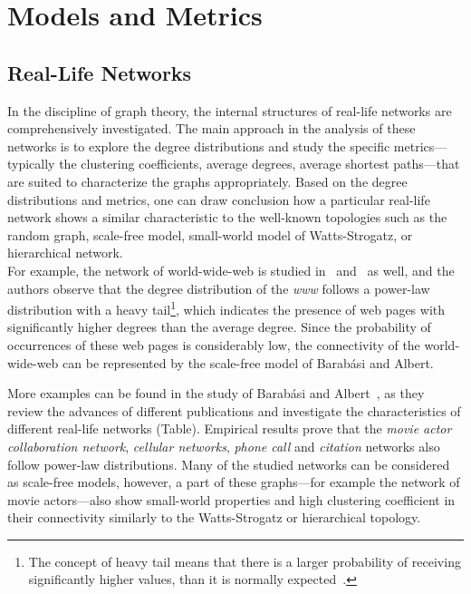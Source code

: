 \section{Models and Metrics}
\subsection{Real-Life Networks}

In the discipline of graph theory, the internal structures of real-life networks are comprehensively investigated. The main approach in the analysis of these networks is to explore the degree distributions and study the specific metrics---typically the clustering coefficients, average degrees, average shortest paths---that are suited to characterize the graphs appropriately. Based on the degree distributions and metrics, one can draw conclusion how a particular real-life network shows a similar characteristic to the well-known topologies such as the random graph, scale-free model, small-world model of Watts-Strogatz, or hierarchical network.\\
For example, the network of world-wide-web is studied in~\cite{www1} and~\cite{www2} as well, and the authors observe that the degree distribution of the \textit{www} follows a power-law distribution with a heavy tail\footnote{The concept of heavy tail means that there is a larger probability of receiving significantly higher values, than it is normally expected~\cite{heavy_tail}.}, which indicates the presence of web pages with significantly higher degrees than the average degree. Since the probability of occurrences of these web pages is considerably low, the connectivity of the world-wide-web can be represented by the scale-free model of Barabási and Albert.


More examples can be found in the study of Barabási and Albert~\cite{statistical_mechanics}, as they review the advances of different publications and investigate the characteristics of different real-life networks (Table). Empirical results prove that the \textit{movie actor collaboration network}, \textit{cellular networks}, \textit{phone call} and \textit{citation} networks also follow power-law distributions. Many of the studied networks can be considered as scale-free models, however, a part of these graphs---for example the network of movie actors---also show small-world properties and high clustering coefficient in their connectivity similarly to the Watts-Strogatz or hierarchical topology.


